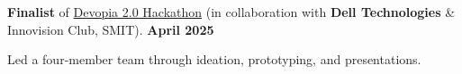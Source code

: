

\begin{zitemize}
\item \textbf{Finalist} of \href{https://www.linkedin.com/posts/thepratikguptaa_devopia2-delltechnologies-innovisionsmit-activity-7320693099700121601-yDfj?utm_source=share&utm_medium=member_desktop&rcm=ACoAAFNTblUBnfiK5ntkG3s1-NXJ0TPqdRrZrz0}{Devopia 2.0 Hackathon} (in collaboration with \textbf{Dell Technologies} \& Innovision Club, SMIT). \hfill \textbf{April 2025}

Led a four-member team through ideation, prototyping, and presentations.

\end{zitemize}
 







